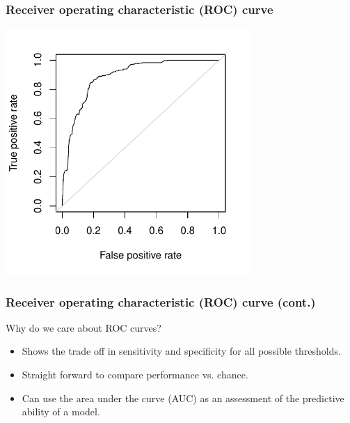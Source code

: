 
\begin{frame}
\frametitle{Receiver operating characteristic (ROC) curve}

\vspace{-8mm}

\begin{center}
\includegraphics[width=0.7\textwidth]{9-5_logistic_reg/figures/spam/ROC.pdf}
\end{center}

\end{frame}


\begin{frame}
\frametitle{Receiver operating characteristic (ROC) curve (cont.)}

Why do we care about ROC curves?

\begin{itemize}
\item Shows the trade off in sensitivity and specificity for all possible thresholds.

\item Straight forward to compare performance vs. chance.

\item Can use the area under the curve (AUC) as an assessment of the predictive ability of a model.

\end{itemize}

\end{frame}


